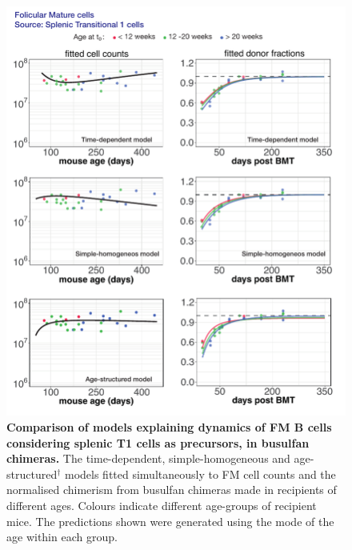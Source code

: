 \documentclass[11pt]{article}
\begin{document}
\begin{figure}[h!]
	\centerline{\includegraphics[scale = 1.1] {FM_T1.pdf}}
	\caption{\small \textbf{Comparison of models  explaining dynamics of FM B cells considering splenic T1 cells as precursors, in busulfan chimeras.} The time-dependent, simple-homogeneous and age-structured$^{\dagger}$ models fitted simultaneously to FM cell counts and the normalised chimerism from busulfan chimeras made in recipients of different ages. Colours indicate different age-groups of recipient mice. The predictions shown were generated using the  mode of the age within each group.}
	\label{fig:FM_T1}
\end{figure}
\end{document}
